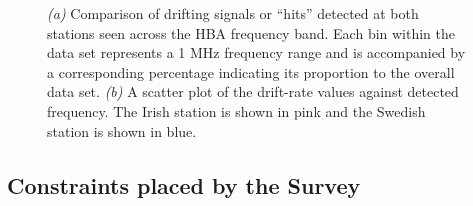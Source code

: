 \begin{figure} %
    \centering
    \qquad
    \caption{\textit{(a)} Comparison of drifting signals or “hits” detected at both stations seen across the HBA frequency band. Each bin within the data set represents a 1 MHz frequency range and is accompanied by a corresponding percentage indicating its proportion to the overall data set. \textit{(b)} A scatter plot of the drift-rate values against detected frequency. The Irish station is shown in pink and the Swedish station is shown in blue.}%
    \label{fig:hits-histogram}%
\end{figure}

\subsection{Constraints placed by the Survey}

